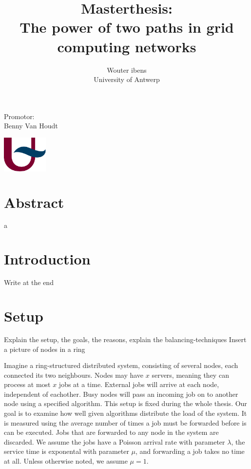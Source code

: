 \documentclass[10pt,a4paper]{article}
\author{Wouter ibens \\ University of Antwerp}
\title{Masterthesis:\\ The power of two paths in grid computing networks}
\begin{document}
\maketitle

\begin{center}
\begin{large}
Promotor: \\ Benny Van Houdt
\end{large}
\vspace{28em}

\includegraphics[width=0.17\textwidth]{resources/ua.pdf}
\end{center}

\thispagestyle{empty}
\newpage

\section*{Abstract}
a

\newpage

\tableofcontents

\newpage

\section*{Introduction}
Write at the end


\section{Setup}
Explain the setup, the goals, the reasons, explain the balancing-techniques
Insert a picture of nodes in a ring

Imagine a ring-structured distributed system, consisting of several nodes, each connected its two neighbours. Nodes may have $x$ servers, meaning they can process at most $x$ jobs at a time. External jobs will arrive at each node, independent of eachother. Busy nodes will pass an incoming job on to another node using a specified algorithm. This setup is fixed during the whole thesis. Our goal is to examine how well given algorithms distribute the load of the system. It is measured using the average number of times a job must be forwarded before is can be executed. Jobs that are forwarded to any node in the system are discarded. We assume the jobs have a Poisson arrival rate with parameter $\lambda$, the service time is exponental with parameter $\mu$, and forwarding a job takes no time at all. Unless otherwise noted, we assume $\mu=1$.
\end{document}
